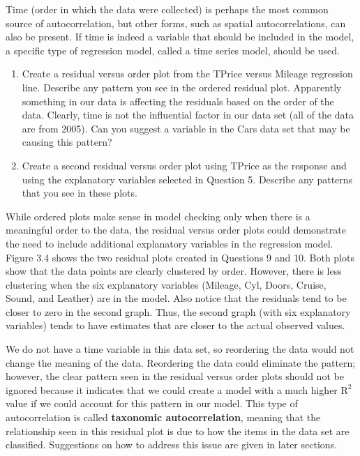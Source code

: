 \documentclass[
]{book}
\begin{document}
Time (order in which the data were collected) is perhaps the most common source of autocorrelation, but other forms, such as spatial autocorrelations, can also be present. If time is indeed a variable that should be included in the model, a specific type of regression model, called a time series model, should be used.

\begin{enumerate}
\def\labelenumi{\arabic{enumi}.}
\setcounter{enumi}{8}
\item
  Create a residual versus order plot from the TPrice versus Mileage regression line. Describe any pattern you see in the ordered residual plot. Apparently something in our data is affecting the residuals based on the order of the data. Clearly, time is not the influential factor in our data set (all of the data are from 2005). Can you suggest a variable in the Cars data set that may be causing this pattern?
\item
  Create a second residual versus order plot using TPrice as the response and using the explanatory variables selected in Question 5. Describe any patterns that you see in these plots.
\end{enumerate}

While ordered plots make sense in model checking only when there is a meaningful order to the data, the residual versus order plots could demonstrate the need to include additional explanatory variables in the regression model. Figure 3.4 shows the two residual plots created in Questions 9 and 10. Both plots show that the data points are clearly clustered by order. However, there is less clustering when the six explanatory variables (Mileage, Cyl, Doors, Cruise, Sound, and Leather) are in the model. Also notice that the residuals tend to be closer to zero in the second graph. Thus, the second graph (with six explanatory variables) tends to have estimates that are closer to the actual observed values.

We do not have a time variable in this data set, so reordering the data would not change the meaning of the data. Reordering the data could eliminate the pattern; however, the clear pattern seen in the residual versus order plots should not be ignored because it indicates that we could create a model with a much higher \(\mathrm{R}^2\) value if we could account for this pattern in our model. This type of autocorrelation is called \textbf{taxonomic autocorrelation}, meaning that the relationship seen in this residual plot is due to how the items in the data set are classified. Suggestions on how to address this issue are given in later sections.
\end{document}
